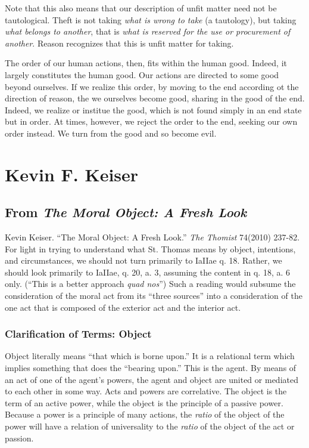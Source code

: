\documentclass{article}
\begin{document}
Note that this also means that our description of unfit matter need
not be tautological.  Theft is not taking \emph{what is wrong to take} (a tautology), but taking \emph{what belongs to
another}, that is \emph{what is reserved for the use or procurement of another}.  Reason recognizes that this is unfit
matter for taking.

The order of our human actions, then, fits within the human good.  Indeed, it largely constitutes the human good.  Our
actions are directed to some good beyond ourselves.  If we realize this order, by moving to the end according ot the
direction of reason, the we ourselves become good, sharing in the good of the end.  Indeed, we realize or institue the
good, which is not found simply in an end state but in order.  At times, however, we reject the order to the end,
seeking our own order instead.  We turn from the good and so become evil.


\section{Kevin F. Keiser}

\subsection{From \emph{The Moral Object:  A Fresh Look}}


Kevin Keiser. ``The Moral Object: A Fresh Look.'' \emph{The Thomist} 74(2010) 237-82. \\

For light in trying to understand what St. Thomas means by object, intentions, and circumstances, we should not turn
primarily to IaIIae q. 18.  Rather, we should look primarily to IaIIae, q. 20, a. 3, assuming the content in q. 18,
a. 6 only.  (``This is a better approach \emph{quad nos}'')  Such a reading would subsume the consideration of the moral
act from its ``three sources'' into a consideration of the one act that is composed of the exterior act and the interior
act.

\subsubsection{Clarification of Terms:  Object}

Object literally means ``that which is borne upon.''  It is a relational term which implies something that does the
``bearing upon.''  This is the agent. By means of an act of one of the agent's powers, the agent and object 
are united or mediated to each other in some way.  Acts and powers are correlative.  The object is the term of an active
power, while the object is the principle of a passive power.  Because a power is a principle of many actions, the
\emph{ratio} of the object of the power will have a relation of universality to the \emph{ratio} of the object of the
act or passion.
\end{document}
